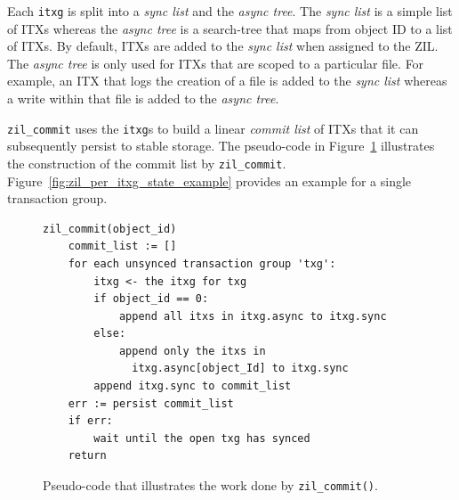 \documentclass[12pt,a4paper,twoside]{book}
\begin{document}
Each \lstinline{itxg} is split into a \textit{sync list} and the \textit{async tree}.
The \textit{sync list} is a simple list of ITXs whereas the \textit{async tree} is a search-tree that maps from object ID to a list of ITXs.
By default, ITXs are added to the \textit{sync list} when assigned to the ZIL.
The \textit{async tree} is only used for ITXs that are scoped to a particular file.
For example, an ITX that logs the creation of a file is added to the \textit{sync list} whereas a write within that file is added to the \textit{async tree}.

\lstinline{zil_commit} uses the \lstinline{itxg}s to build a linear \textit{commit list} of ITXs that it can subsequently persist to stable storage.
The pseudo-code in Figure~\ref{lst:zil_commit} illustrates the construction of the commit list by \lstinline{zil_commit}.
Figure~\ref{fig:zil_per_itxg_state_example} provides an example for a single transaction group.
\begin{figure}[h]
    \begin{lstlisting}
zil_commit(object_id)
    commit_list := []
    for each unsynced transaction group 'txg':
        itxg <- the itxg for txg
        if object_id == 0:
            append all itxs in itxg.async to itxg.sync
        else:
            append only the itxs in
              itxg.async[object_Id] to itxg.sync
        append itxg.sync to commit_list
    err := persist commit_list
    if err:
        wait until the open txg has synced
    return
\end{lstlisting}
    \caption{Pseudo-code that illustrates the work done by \lstinline{zil_commit()}.}
    \label{lst:zil_commit}
\end{figure}
\end{document}
